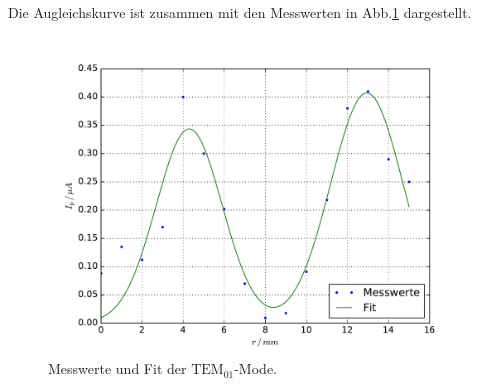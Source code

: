 Die Augleichskurve ist zusammen mit den Messwerten in Abb.\ref{mode2fit} dargestellt.
\begin{figure}[H]
  \centering
  \includegraphics[width=14cm]{bilder/T_10.pdf}
  \caption{Messwerte und Fit der  $\text{TEM}_{01}$-Mode.}
  \label{mode2fit}
\end{figure}
